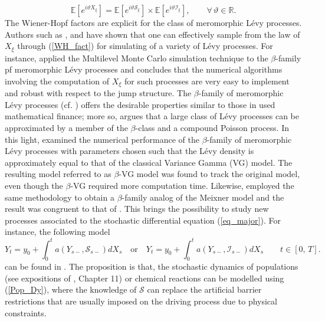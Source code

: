 \begin{equation}\label{WH_fact}
    \mathbb{E}[e^{i \vartheta X_{\xi}}] = \mathbb{E}[e^{i \vartheta \mathcal{S}_{\xi}}] \times \mathbb{E}[e^{i \vartheta \mathcal{I}_{\xi}}], \qquad \forall \, \vartheta \in \mathbb{R}.
\end{equation}
The Wiener-Hopf factors are explicit for the class of meromorphic L\'evy processes. Authors such as ,  and \break {} have shown that one can effectively sample from the law of $X_\xi$ through (\ref{WH_fact}) for  simulating of a variety of L\'evy processes. For instance,  applied the Multilevel Monte Carlo simulation technique to the $\beta$-family pf meromorphic L\'evy processes and concludes that the numerical algorithms involving the computation of $X_\xi$ for such processes are very easy to implement and robust with respect to the jump structure. The $\beta$-family of meromorphic L\'evy processes (cf. ) offers the desirable properties similar to those in used  mathematical finance; more so,  argues that a large class of L\'evy processes can be approximated by a member of the $\beta$-class and a compound Poisson process. In this light,  examined the numerical performance of the $\beta$-family of meromorphic L\'evy processes with parameters chosen such that the L\'evy density is approximately equal to that of the classical Variance Gamma (VG) model. The resulting model referred to as $\beta$-VG model was found to track the original model, even though the $\beta$-VG required more computation time. Likewise,  employed the same methodology to obtain a $\beta$-family analog of the Meixner model and the result was congruent to that of . This brings the possibility to study new processes associated to the stochastic differential equation (\ref{eq_major}). For instance, the following model
\begin{equation}\label{Pop_Dy}
      Y_t = y_0  + \int_0^t a(Y_{s-}, \mathcal{S}_{s-})dX_s  \quad \text{or} \quad  Y_t = y_0  + \int_0^t a(Y_{s-}, \mathcal{I}_{s-})dX_s \qquad t \in [0, \, T].
\end{equation}
can be found in . The proposition is that, the stochastic dynamics of populations (see expositions of ,  Chapter 11) or chemical reactions can be modelled using (\ref{Pop_Dy}), where the knowledge of $\mathcal{S}$ can replace the artificial barrier restrictions that are usually imposed on the driving process due to physical constraints.

